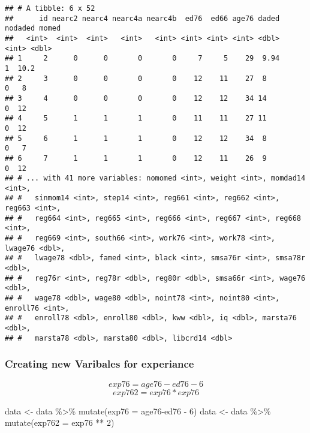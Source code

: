 \documentclass[
]{article}
\newenvironment{Shaded}{\begin{snugshade}}{\end{snugshade}}
\newcommand{\AttributeTok}[1]{\textcolor[rgb]{0.77,0.63,0.00}{#1}}
\newcommand{\DecValTok}[1]{\textcolor[rgb]{0.00,0.00,0.81}{#1}}
\newcommand{\FunctionTok}[1]{\textcolor[rgb]{0.00,0.00,0.00}{#1}}
\newcommand{\NormalTok}[1]{#1}
\newcommand{\OtherTok}[1]{\textcolor[rgb]{0.56,0.35,0.01}{#1}}
\newcommand{\SpecialCharTok}[1]{\textcolor[rgb]{0.00,0.00,0.00}{#1}}
\begin{document}
\begin{verbatim}
## # A tibble: 6 x 52
##      id nearc2 nearc4 nearc4a nearc4b  ed76  ed66 age76 daded nodaded momed
##   <int>  <int>  <int>   <int>   <int> <int> <int> <int> <dbl>   <int> <dbl>
## 1     2      0      0       0       0     7     5    29  9.94       1  10.2
## 2     3      0      0       0       0    12    11    27  8          0   8  
## 3     4      0      0       0       0    12    12    34 14          0  12  
## 4     5      1      1       1       0    11    11    27 11          0  12  
## 5     6      1      1       1       0    12    12    34  8          0   7  
## 6     7      1      1       1       0    12    11    26  9          0  12  
## # ... with 41 more variables: nomomed <int>, weight <int>, momdad14 <int>,
## #   sinmom14 <int>, step14 <int>, reg661 <int>, reg662 <int>, reg663 <int>,
## #   reg664 <int>, reg665 <int>, reg666 <int>, reg667 <int>, reg668 <int>,
## #   reg669 <int>, south66 <int>, work76 <int>, work78 <int>, lwage76 <dbl>,
## #   lwage78 <dbl>, famed <int>, black <int>, smsa76r <int>, smsa78r <dbl>,
## #   reg76r <int>, reg78r <dbl>, reg80r <dbl>, smsa66r <int>, wage76 <dbl>,
## #   wage78 <dbl>, wage80 <dbl>, noint78 <int>, noint80 <int>, enroll76 <int>,
## #   enroll78 <dbl>, enroll80 <dbl>, kww <dbl>, iq <dbl>, marsta76 <dbl>,
## #   marsta78 <dbl>, marsta80 <dbl>, libcrd14 <dbl>
\end{verbatim}

\hypertarget{creating-new-varibales-for-experiance}{%
\subsubsection{Creating new Varibales for
experiance}\label{creating-new-varibales-for-experiance}}

\[exp76=age76-ed76-6\] \[exp762=exp76*exp76\]

\begin{Shaded}
\begin{Highlighting}[]
\NormalTok{data }\OtherTok{\textless{}{-}}\NormalTok{ data }\SpecialCharTok{\%\textgreater{}\%} \FunctionTok{mutate}\NormalTok{(}\AttributeTok{exp76 =}\NormalTok{  age76}\SpecialCharTok{{-}}\NormalTok{ed76 }\SpecialCharTok{{-}} \DecValTok{6}\NormalTok{)}
\NormalTok{data }\OtherTok{\textless{}{-}}\NormalTok{ data }\SpecialCharTok{\%\textgreater{}\%} \FunctionTok{mutate}\NormalTok{(}\AttributeTok{exp762 =}\NormalTok{ exp76 }\SpecialCharTok{**} \DecValTok{2}\NormalTok{)}
\end{Highlighting}
\end{Shaded}
\end{document}
